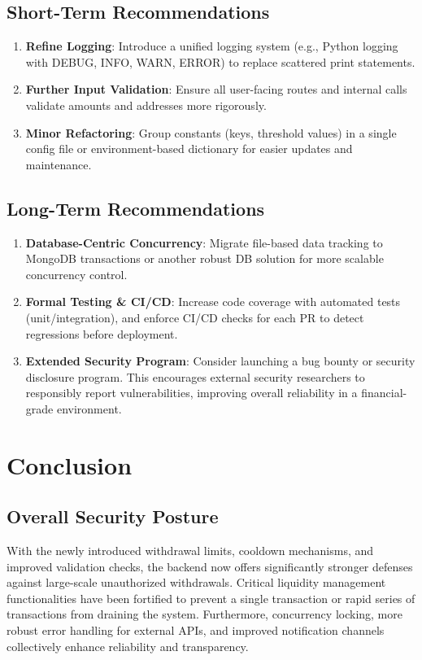\documentclass[11pt,a4paper]{article}
\begin{document}
\subsection{Short-Term Recommendations}
\begin{enumerate}
    \item \textbf{Refine Logging}: Introduce a unified logging system (e.g., Python logging with DEBUG, INFO, WARN, ERROR) to replace scattered print statements.
    \item \textbf{Further Input Validation}: Ensure all user-facing routes and internal calls validate amounts and addresses more rigorously.
    \item \textbf{Minor Refactoring}: Group constants (keys, threshold values) in a single config file or environment-based dictionary for easier updates and maintenance.
\end{enumerate}

\subsection{Long-Term Recommendations}
\begin{enumerate}
    \item \textbf{Database-Centric Concurrency}: Migrate file-based data tracking to MongoDB transactions or another robust DB solution for more scalable concurrency control.
    \item \textbf{Formal Testing \& CI/CD}: Increase code coverage with automated tests (unit/integration), and enforce CI/CD checks for each PR to detect regressions before deployment.
    \item \textbf{Extended Security Program}: Consider launching a bug bounty or security disclosure program. This encourages external security researchers to responsibly report vulnerabilities, improving overall reliability in a financial-grade environment.
\end{enumerate}

\section{Conclusion}

\subsection{Overall Security Posture}
With the newly introduced withdrawal limits, cooldown mechanisms, and improved validation checks, the backend now offers significantly stronger defenses against large-scale unauthorized withdrawals. Critical liquidity management functionalities have been fortified to prevent a single transaction or rapid series of transactions from draining the system. Furthermore, concurrency locking, more robust error handling for external APIs, and improved notification channels collectively enhance reliability and transparency.
\end{document}
